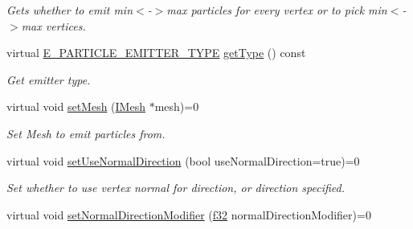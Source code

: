 \begin{DoxyCompactItemize}
\begin{DoxyCompactList}\small\item\em Gets whether to emit min$<$-\/$>$max particles for every vertex or to pick min$<$-\/$>$max vertices. \end{DoxyCompactList}\item 
\mbox{\label{classirr_1_1scene_1_1IParticleMeshEmitter_acb0b3f4c04c12da20e3503773aa2eb2c}} 
virtual \hyperlink{namespaceirr_1_1scene_a3e251a881c886884a78adea2e546272b}{E\+\_\+\+P\+A\+R\+T\+I\+C\+L\+E\+\_\+\+E\+M\+I\+T\+T\+E\+R\+\_\+\+T\+Y\+PE} \hyperlink{classirr_1_1scene_1_1IParticleMeshEmitter_acb0b3f4c04c12da20e3503773aa2eb2c}{get\+Type} () const
\begin{DoxyCompactList}\small\item\em Get emitter type. \end{DoxyCompactList}\item 
\mbox{\label{classirr_1_1scene_1_1IParticleMeshEmitter_ae4c0410bb93d6d8404c79953b4bcfde6}} 
virtual void \hyperlink{classirr_1_1scene_1_1IParticleMeshEmitter_ae4c0410bb93d6d8404c79953b4bcfde6}{set\+Mesh} (\hyperlink{classirr_1_1scene_1_1IMesh}{I\+Mesh} $\ast$mesh)=0
\begin{DoxyCompactList}\small\item\em Set Mesh to emit particles from. \end{DoxyCompactList}\item 
\mbox{\label{classirr_1_1scene_1_1IParticleMeshEmitter_abf450e804340f13771c58d6bbb1ba01f}} 
virtual void \hyperlink{classirr_1_1scene_1_1IParticleMeshEmitter_abf450e804340f13771c58d6bbb1ba01f}{set\+Use\+Normal\+Direction} (bool use\+Normal\+Direction=true)=0
\begin{DoxyCompactList}\small\item\em Set whether to use vertex normal for direction, or direction specified. \end{DoxyCompactList}\item 
\mbox{\label{classirr_1_1scene_1_1IParticleMeshEmitter_af07cce3784ce2b4968bd1808f0b6cfb9}} 
virtual void \hyperlink{classirr_1_1scene_1_1IParticleMeshEmitter_af07cce3784ce2b4968bd1808f0b6cfb9}{set\+Normal\+Direction\+Modifier} (\hyperlink{namespaceirr_a0277be98d67dc26ff93b1a6a1d086b07}{f32} normal\+Direction\+Modifier)=0

\end{DoxyCompactItemize}
